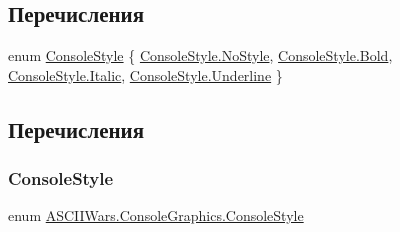 \subsection*{Перечисления}
\begin{DoxyCompactItemize}
\item 
enum \hyperlink{namespace_a_s_c_i_i_wars_1_1_console_graphics_a9b323f4b2bf48062c9245b24e74b2882}{Console\+Style} \{ \hyperlink{namespace_a_s_c_i_i_wars_1_1_console_graphics_a9b323f4b2bf48062c9245b24e74b2882aaf0ab25243139e9c44bdbfbde2ce6f1d}{Console\+Style.\+No\+Style}, 
\hyperlink{namespace_a_s_c_i_i_wars_1_1_console_graphics_a9b323f4b2bf48062c9245b24e74b2882a114c3050111d8b8ddd830b99ccebd246}{Console\+Style.\+Bold}, 
\hyperlink{namespace_a_s_c_i_i_wars_1_1_console_graphics_a9b323f4b2bf48062c9245b24e74b2882a1d874710ccdcd46b95397049d2e7500c}{Console\+Style.\+Italic}, 
\hyperlink{namespace_a_s_c_i_i_wars_1_1_console_graphics_a9b323f4b2bf48062c9245b24e74b2882a852721aa5fc738dfedff2945d71da439}{Console\+Style.\+Underline}
 \}
\end{DoxyCompactItemize}


\subsection{Перечисления}
\hypertarget{namespace_a_s_c_i_i_wars_1_1_console_graphics_a9b323f4b2bf48062c9245b24e74b2882}{}\label{namespace_a_s_c_i_i_wars_1_1_console_graphics_a9b323f4b2bf48062c9245b24e74b2882} 
\subsubsection{\texorpdfstring{Console\+Style}{ConsoleStyle}}
{\footnotesize\ttfamily enum \hyperlink{namespace_a_s_c_i_i_wars_1_1_console_graphics_a9b323f4b2bf48062c9245b24e74b2882}{A\+S\+C\+I\+I\+Wars.\+Console\+Graphics.\+Console\+Style}\hspace{0.3cm}{\ttfamily [strong]}}

